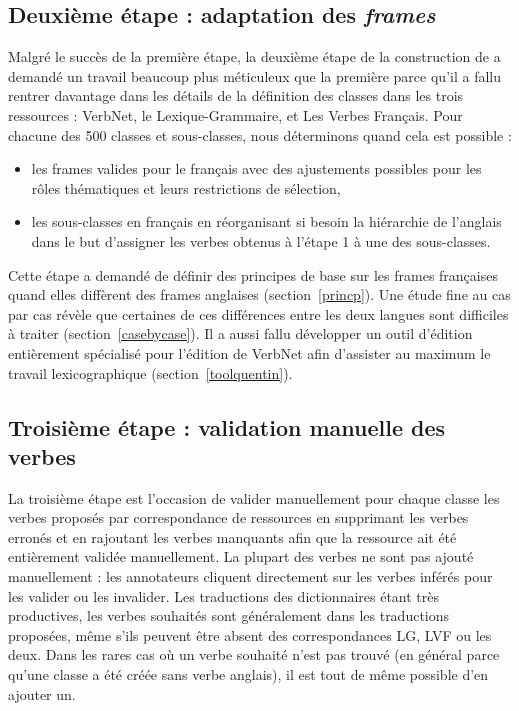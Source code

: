 \subsection{Deuxième étape : adaptation des \textit{frames}}\label{second}

Malgré le succès de la première étape, la deuxième étape de la construction de
\verbenet{} a demandé un travail beaucoup plus méticuleux que la première parce
qu'il a fallu rentrer davantage dans les détails de la définition des classes
dans les trois ressources : VerbNet, le Lexique-Grammaire, et Les Verbes
Français. Pour chacune des 500 classes et sous-classes, nous déterminons quand
cela est possible :

\begin{itemize}
    \item les frames valides pour le français avec des ajustements possibles
        pour les rôles thématiques et leurs restrictions de sélection,
    \item les sous-classes en français en réorganisant si besoin la hiérarchie
        de l'anglais dans le but d'assigner les verbes obtenus à l'étape 1 à
        une des sous-classes.
\end{itemize}

Cette étape a demandé de définir des principes de base sur les frames
françaises quand elles diffèrent des frames anglaises (section~\ref{princp}).
Une étude fine au cas par cas révèle que certaines de ces différences entre les
deux langues sont difficiles à traiter (section~\ref{casebycase}). Il a aussi
fallu développer un outil d'édition entièrement spécialisé pour l'édition de
VerbNet afin d'assister au maximum le travail lexicographique
(section~\ref{toolquentin}).

\subsection{Troisième étape : validation manuelle des verbes}
\label{third}

La troisième étape est l'occasion de valider manuellement pour chaque classe
les verbes proposés par correspondance de ressources en supprimant les verbes
erronés et en rajoutant les verbes manquants afin que la ressource ait été
entièrement validée manuellement. La plupart des verbes ne sont pas ajouté
manuellement : les annotateurs cliquent directement sur les verbes inférés pour
les valider ou les invalider.  Les traductions des dictionnaires étant très
productives, les verbes souhaités sont généralement dans les traductions
proposées, même s'ils peuvent être absent des correspondances LG, LVF ou les
deux. Dans les rares cas où un verbe souhaité n'est pas trouvé (en général
parce qu'une classe a été créée sans verbe anglais), il est tout de même
possible d'en ajouter un.

